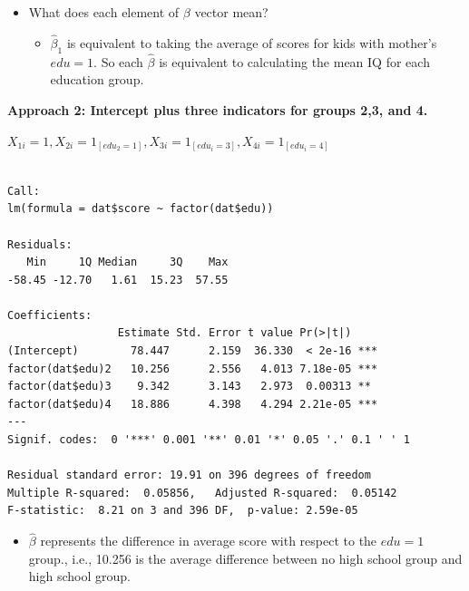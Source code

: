 \documentclass[
  letterpaper,
  DIV=11,
  numbers=noendperiod]{scrreprt}
\newenvironment{Shaded}{\begin{snugshade}}{\end{snugshade}}
\newcommand{\FunctionTok}[1]{\textcolor[rgb]{0.28,0.35,0.67}{#1}}
\newcommand{\NormalTok}[1]{\textcolor[rgb]{0.00,0.23,0.31}{#1}}
\newcommand{\OtherTok}[1]{\textcolor[rgb]{0.00,0.23,0.31}{#1}}
\newcommand{\SpecialCharTok}[1]{\textcolor[rgb]{0.37,0.37,0.37}{#1}}
\providecommand{\tightlist}{%
  \setlength{\itemsep}{0pt}\setlength{\parskip}{0pt}}\usepackage{longtable,booktabs,array}
\begin{document}
\begin{itemize}
\tightlist
\item
  What does each element of \(\beta\) vector mean?

  \begin{itemize}
  \tightlist
  \item
    \(\hat{\beta}_1\) is equivalent to taking the average of scores for
    kids with mother's \(edu=1\). So each \(\hat{\beta}\) is equivalent
    to calculating the mean IQ for each education group.
  \end{itemize}
\end{itemize}

\textbf{Approach 2: Intercept plus three indicators for groups 2,3, and
4.}

\(X_{1i} = 1 , X_{2i} = 1_{[edu_2=1]}, X_{3i} = 1_{[edu_i=3]}, X_{4i} = 1_{[edu_i=4]}\)

\begin{Shaded}
\end{Shaded}

\begin{verbatim}

Call:
lm(formula = dat$score ~ factor(dat$edu))

Residuals:
   Min     1Q Median     3Q    Max 
-58.45 -12.70   1.61  15.23  57.55 

Coefficients:
                 Estimate Std. Error t value Pr(>|t|)    
(Intercept)        78.447      2.159  36.330  < 2e-16 ***
factor(dat$edu)2   10.256      2.556   4.013 7.18e-05 ***
factor(dat$edu)3    9.342      3.143   2.973  0.00313 ** 
factor(dat$edu)4   18.886      4.398   4.294 2.21e-05 ***
---
Signif. codes:  0 '***' 0.001 '**' 0.01 '*' 0.05 '.' 0.1 ' ' 1

Residual standard error: 19.91 on 396 degrees of freedom
Multiple R-squared:  0.05856,   Adjusted R-squared:  0.05142 
F-statistic:  8.21 on 3 and 396 DF,  p-value: 2.59e-05
\end{verbatim}

\begin{itemize}
\tightlist
\item
  \(\hat{\beta}\) represents the difference in average score with
  respect to the \(edu=1\) group., i.e., 10.256 is the average
  difference between no high school group and high school group.
\end{itemize}
\end{document}
